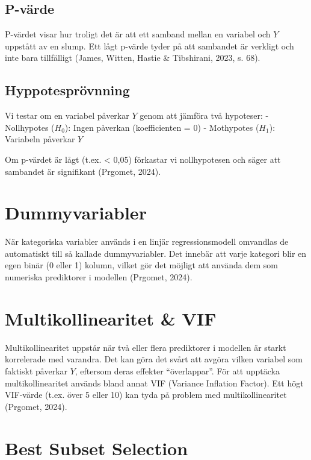 \documentclass[
  letterpaper,
  DIV=11,
  numbers=noendperiod]{scrreprt}
\begin{document}
\subsection{P-värde}\label{p-vuxe4rde}

P-värdet visar hur troligt det är att ett samband mellan en variabel och
\(Y\) uppstått av en slump. Ett lågt p-värde tyder på att sambandet är
verkligt och inte bara tillfälligt (James, Witten, Hastie \& Tibshirani,
2023, s. 68).

\subsection{Hyppotesprövnning}\label{hyppotespruxf6vnning}

Vi testar om en variabel påverkar \(Y\) genom att jämföra två hypoteser:
- Nollhypotes (\(H_0\)): Ingen påverkan (koefficienten = 0) - Mothypotes
(\(H_1\)): Variabeln påverkar \(Y\)

Om p-värdet är lågt (t.ex. \textless{} 0,05) förkastar vi nollhypotesen
och säger att sambandet är signifikant (Prgomet, 2024).

\section{Dummyvariabler}\label{dummyvariabler}

När kategoriska variabler används i en linjär regressionsmodell
omvandlas de automatiskt till så kallade dummyvariabler. Det innebär att
varje kategori blir en egen binär (0 eller 1) kolumn, vilket gör det
möjligt att använda dem som numeriska prediktorer i modellen (Prgomet,
2024).

\section{Multikollinearitet \& VIF}\label{multikollinearitet-vif}

Multikollinearitet uppstår när två eller flera prediktorer i modellen är
starkt korrelerade med varandra. Det kan göra det svårt att avgöra
vilken variabel som faktiskt påverkar \(Y\), eftersom deras effekter
``överlappar''. För att upptäcka multikollinearitet används bland annat
VIF (Variance Inflation Factor). Ett högt VIF-värde (t.ex. över 5 eller
10) kan tyda på problem med multikollinearitet (Prgomet, 2024).

\section{Best Subset Selection}\label{best-subset-selection}
\end{document}
